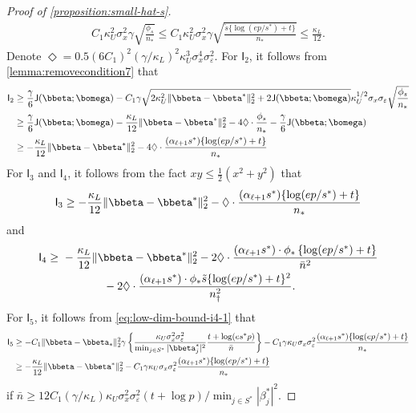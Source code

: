 \documentclass[10pt]{article}
\numberwithin{equation}{section}
\begin{document}
\begin{proof}[Proof of \cref{proposition:small-hat-s}]
\begin{align*}
    C_1 \kappa_U^2\sigma_x^2 \gamma \sqrt{\frac{\phi_s}{n_*}} \le C_1 \kappa_U^2 \sigma_x^2 \gamma \sqrt{\frac{\tilde{s} \{\log(ep/s^*) + t\}}{n_*}} \le \frac{\kappa_L}{12}.
\end{align*} Denote $\Diamond=0.5 (6C_1)^2 (\gamma/\kappa_L)^2 \kappa_U^3 \sigma_x^4\sigma_\varepsilon^2$. 
For $\mathsf{I}_2$, it follows from \cref{lemma:removecondition7} that
\begin{align*}
    \mathsf{I}_2 &\ge \frac{\gamma}{6} \mathsf{J}(\bbeta; \bomega) - C_1 \gamma \sqrt{2\kappa_U^2\|\bbeta - \bbeta^*\|_2^2 + 2\mathsf{J}(\bbeta; \bomega)} \kappa_U^{1/2} \sigma_x \sigma_\varepsilon \sqrt{\frac{\phi_s}{n_*}} \\
    &\ge \frac{\gamma}{6} \mathsf{J}(\bbeta;\bomega) - \frac{\kappa_L}{12} \|\bbeta-\bbeta^*\|_2^2 - 4\Diamond \cdot \frac{\phi_s}{n_*} - \frac{\gamma}{6} \mathsf{J}(\bbeta;\bomega) \\
    &\ge - \frac{\kappa_L}{12} \|\bbeta-\bbeta^*\|_2^2 - 4\Diamond \cdot \frac{(\alpha_{\ell+1} s^*) \{\log(ep/s^*)+t\}}{n_*}
\end{align*}
For $\mathsf{I}_3$ and $\mathsf{I}_4$, it follows from the fact $xy \le \frac{1}{2} (x^2 + y^2)$ that
\begin{align*}
    \mathsf{I}_3 \ge -\frac{\kappa_L}{12} \|\bbeta - \bbeta^*\|_2^2 - \Diamond \cdot \frac{(\alpha_{\ell+1} s^*) \{\log(ep/s^*) + t\} }{n_*} 
\end{align*} and
\begin{align*}
    \mathsf{I}_4 \ge & ~-\frac{\kappa_L}{12} \|\bbeta - \bbeta^*\|_2^2 - 2\Diamond \cdot \frac{(\alpha_{\ell+1} s^*) \cdot \phi_* \left\{\log(ep/s^*) + t\right\}}{\bar{n}^2} \\
    &~~~~~~~~~~~~ - 2\Diamond \cdot \frac{(\alpha_{\ell+1} s^*) \cdot \phi_* \tilde{s} \{\log(ep/s^*) + t\}^2}{n_\dagger^2}.
\end{align*} For $\mathsf{I}_5$, it follows from \eqref{eq:low-dim-bound-i4-1} that
\begin{align*}
\mathsf{I}_5 &\ge -C_1 \|\bbeta - \bbeta_*\|_2^2  \gamma \left\{\frac{\kappa_U \sigma_x^2\sigma_\varepsilon^2}{ \min_{j\in S^*} |\bbeta_j^ *|^2}\frac{t + \log(es^*p)}{\bar{n}}\right\} - C_1 \gamma \kappa_U\sigma_x\sigma_\varepsilon^2 \frac{(\alpha_{\ell+1} s^*) \{\log(ep/s^*) + t\}}{n_*} \\
&\ge -\frac{\kappa_L}{12} \|\bbeta - \bbeta^*\|_2^2 - C_1 \gamma \kappa_U\sigma_x\sigma_\varepsilon^2 \frac{(\alpha_{\ell+1} s^*) \{\log(ep/s^*) + t\}}{n_*}
\end{align*} if $\bar{n} \ge 12C_1 (\gamma/\kappa_L) \kappa_U\sigma_x^2\sigma_\varepsilon^2 (t + \log p) / \min_{j\in S^*} |\beta_j^*|^2$. 

\end{proof}
\end{document}
